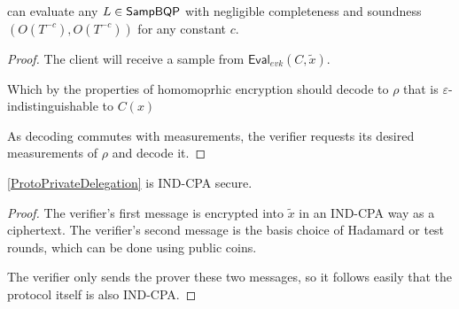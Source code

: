 \begin{thm}
    \label{QPIP1thm}
	 can evaluate any $L\in\operatorname{\mathsf{SampBQP}}$ with negligible completeness and soundness $(O(T^{-c}), O(T^{-c}))$ for any constant $c$.
\end{thm}
\begin{proof}
	The client will receive a sample from $\mathsf{Eval}_{evk}(C, \tilde{x})$. 

	Which by the properties of homomoprhic encryption should decode to $\rho$ that is $\varepsilon$-indistinguishable to $C(x)$ 

	As decoding commutes with measurements, the verifier requests its desired measurements of $\rho$ and decode it.
\end{proof}

\begin{thm}
	\autoref{ProtoPrivateDelegation} is IND-CPA secure.
\end{thm}
\begin{proof}
	The verifier's first message is encrypted into $\tilde{x}$ in an IND-CPA way as a ciphertext.
	The verifier's second message is the basis choice of Hadamard or test rounds, which can be done using public coins.

	The verifier only sends the prover these two messages, so it follows  easily that the protocol itself is also IND-CPA. 
\end{proof}
